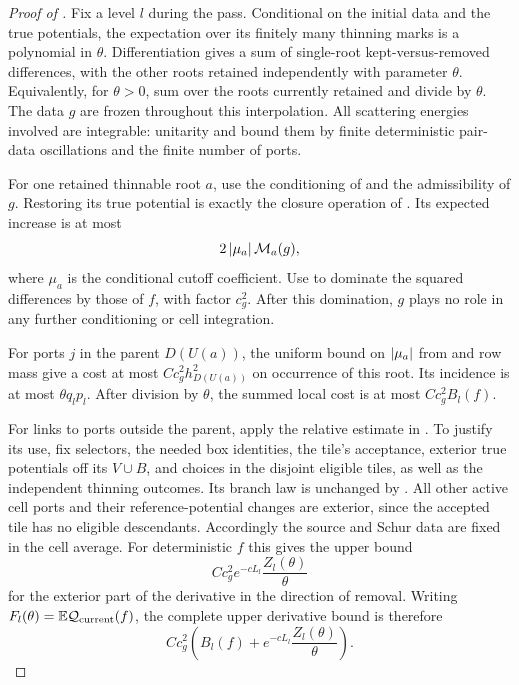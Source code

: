 \begin{proof}[Proof of ]
Fix a level $l$ during the pass.  Conditional on the initial data and
the true potentials, the expectation over its finitely many thinning
marks is a polynomial in $\theta$.  Differentiation gives a sum of
single-root kept-versus-removed differences, with the other roots
retained independently with parameter $\theta$.  Equivalently, for
$\theta>0$, sum over the roots currently retained and divide by
$\theta$.  The data $g$ are frozen throughout this interpolation.
All scattering energies involved are integrable: unitarity and
 bound them by finite deterministic pair-data
oscillations and the finite number of ports.

For one retained thinnable root $a$, use the conditioning of
 and the admissibility of $g$.  Restoring its true
potential is exactly the closure operation of
.  Its expected increase is at most
\[
                         2\left\lvert\mu_a\right\rvert\mathcal M_a(g),
\]
where $\mu_a$ is the conditional cutoff coefficient.  Use
 to dominate the squared differences by those
of $f$, with factor $c_g^2$.  After this domination, $g$ plays no role
in any further conditioning or cell integration.

For ports $j$ in the parent $D(U(a))$, the uniform bound on
$\left\lvert\mu_a\right\rvert$ from  and row mass give a cost at most
$C c_g^2 h_{D(U(a))}^2$ on occurrence of this root.  Its incidence is
at most $\theta q_lp_l$.  After division by $\theta$, the summed local
cost is at most $C c_g^2 B_l(f)$.

For links to ports outside the parent, apply the relative estimate in
.  To justify its use, fix selectors, the needed box
identities, the tile's acceptance, exterior true potentials off its
$V\cup B$, and choices in the disjoint eligible tiles, as well as the
independent thinning outcomes.  Its branch law is unchanged by
.  All other active cell ports and their
reference-potential changes are exterior, since the accepted tile has
no eligible descendants.
Accordingly the source and Schur data are fixed in the cell average.
For deterministic $f$ this gives the upper bound
\[
                C c_g^2 e^{-cL_l}\frac{Z_l(\theta)}{\theta}
\]
for the exterior part of the derivative in the direction of removal.
Writing $F_l(\theta)=\mathbb E\mathcal Q_{\rm current}(f)$, the complete
upper derivative bound is therefore
\begin{equation}
 C c_g^2\left(B_l(f)+
                    e^{-cL_l}\frac{Z_l(\theta)}{\theta}\right).
 \label{hier:differential}
\end{equation}


\end{proof}
